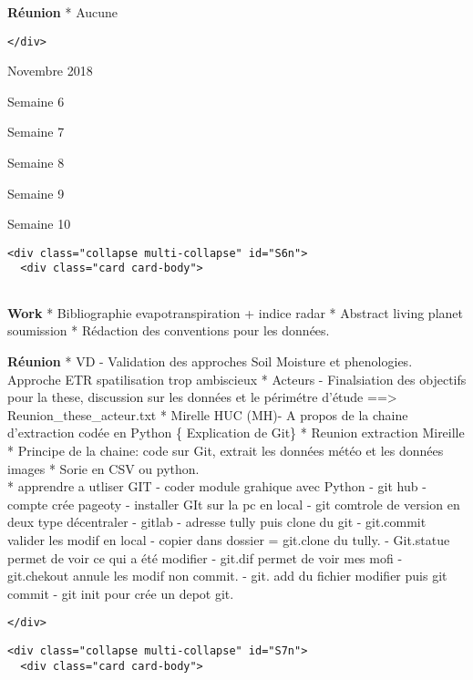 \documentclass[11pt]{article}
\begin{document}
\textbf{Réunion} * Aucune

\begin{verbatim}
</div>
\end{verbatim}

    Novembre 2018

\hypertarget{NOV2017}{}
Semaine 6

Semaine 7

Semaine 8

Semaine 9

Semaine 10

\begin{verbatim}
<div class="collapse multi-collapse" id="S6n">
  <div class="card card-body">
    
\end{verbatim}

\textbf{Work} * Bibliographie evapotranspiration + indice radar *
Abstract living planet soumission * Rédaction des conventions pour les
données.

\textbf{Réunion} * VD - Validation des approches Soil Moisture et
phenologies. Approche ETR spatilisation trop ambiscieux * Acteurs -
Finalsiation des objectifs pour la these, discussion sur les données et
le périmétre d'étude ==\textgreater{} Reunion\_these\_acteur.txt *
Mirelle HUC (MH)- A propos de la chaine d'extraction codée en Python \{
Explication de Git\} * Reunion extraction Mireille * Principe de la
chaine: code sur Git, extrait les données météo et les données images *
Sorie en CSV ou python.\\
* apprendre a utliser GIT - coder module grahique avec Python - git hub
-compte crée pageoty - installer GIt sur la pc en local - git comtrole
de version en deux type décentraler - gitlab - adresse tully puis clone
du git - git.commit valider les modif en local - copier dans dossier =
git.clone du tully. - Git.statue permet de voir ce qui a été modifier -
git.dif permet de voir mes mofi - git.chekout annule les modif non
commit. - git. add du fichier modifier puis git commit - git init pour
crée un depot git.

\begin{verbatim}
</div>
\end{verbatim}

\begin{verbatim}
<div class="collapse multi-collapse" id="S7n">
  <div class="card card-body">
      
\end{verbatim}
\end{document}
